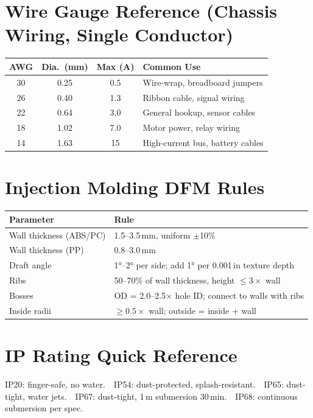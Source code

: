 \section*{Wire Gauge Reference (Chassis Wiring, Single Conductor)}
\begin{table}[htbp]\centering\small
\begin{tabularx}{\textwidth}{c c c X}
\toprule
\textbf{AWG} & \textbf{Dia.\ (mm)} & \textbf{Max (A)} & \textbf{Common Use} \\
\midrule
30 & 0.25 & 0.5 & Wire-wrap, breadboard jumpers \\
26 & 0.40 & 1.3 & Ribbon cable, signal wiring \\
22 & 0.64 & 3.0 & General hookup, sensor cables \\
18 & 1.02 & 7.0 & Motor power, relay wiring \\
14 & 1.63 & 15 & High-current bus, battery cables \\
\bottomrule
\end{tabularx}
\end{table}

\section*{Injection Molding DFM Rules}
\begin{table}[htbp]\centering\small
\begin{tabularx}{\textwidth}{l X}
\toprule
\textbf{Parameter} & \textbf{Rule} \\
\midrule
Wall thickness (ABS/PC) & 1.5--3.5\,mm, uniform $\pm$10\% \\
Wall thickness (PP) & 0.8--3.0\,mm \\
Draft angle & \ang{1}--\ang{2} per side; add \ang{1} per 0.001\,in texture depth \\
Ribs & 50--70\% of wall thickness, height $\leq 3\times$ wall \\
Bosses & OD = 2.0--2.5$\times$ hole ID; connect to walls with ribs \\
Inside radii & $\geq 0.5\times$ wall; outside = inside + wall \\
\bottomrule
\end{tabularx}
\end{table}

\section*{IP Rating Quick Reference}
IP20: finger-safe, no water.\ \ IP54: dust-protected, splash-resistant.\ \ IP65: dust-tight, water jets.\ \ IP67: dust-tight, 1\,m submersion 30\,min.\ \ IP68: continuous submersion per spec.

